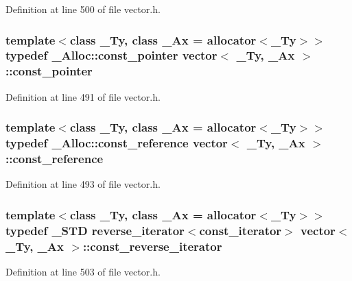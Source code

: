 Definition at line 500 of file vector.\+h.

\hypertarget{classvector_a52b51d85dd355481f31b8d1643d5b969}{
\subsubsection[{const\+\_\+pointer}]{\setlength{\rightskip}{0pt plus 5cm}template$<$class \+\_\+\+Ty, class \+\_\+\+Ax = allocator$<$\+\_\+\+Ty$>$$>$ typedef \+\_\+\+Alloc\+::const\+\_\+pointer {\bf vector}$<$ \+\_\+\+Ty, \+\_\+\+Ax $>$\+::{\bf const\+\_\+pointer}}}\label{classvector_a52b51d85dd355481f31b8d1643d5b969}


Definition at line 491 of file vector.\+h.

\hypertarget{classvector_a22ae7381c38ba94955ba45177b24a51f}{
\subsubsection[{const\+\_\+reference}]{\setlength{\rightskip}{0pt plus 5cm}template$<$class \+\_\+\+Ty, class \+\_\+\+Ax = allocator$<$\+\_\+\+Ty$>$$>$ typedef \+\_\+\+Alloc\+::const\+\_\+reference {\bf vector}$<$ \+\_\+\+Ty, \+\_\+\+Ax $>$\+::{\bf const\+\_\+reference}}}\label{classvector_a22ae7381c38ba94955ba45177b24a51f}


Definition at line 493 of file vector.\+h.

\hypertarget{classvector_aefbb12258ea747e127ef628e91e3c061}{
\subsubsection[{const\+\_\+reverse\+\_\+iterator}]{\setlength{\rightskip}{0pt plus 5cm}template$<$class \+\_\+\+Ty, class \+\_\+\+Ax = allocator$<$\+\_\+\+Ty$>$$>$ typedef \+\_\+\+S\+T\+D {\bf reverse\+\_\+iterator}$<${\bf const\+\_\+iterator}$>$ {\bf vector}$<$ \+\_\+\+Ty, \+\_\+\+Ax $>$\+::{\bf const\+\_\+reverse\+\_\+iterator}}}\label{classvector_aefbb12258ea747e127ef628e91e3c061}


Definition at line 503 of file vector.\+h.

